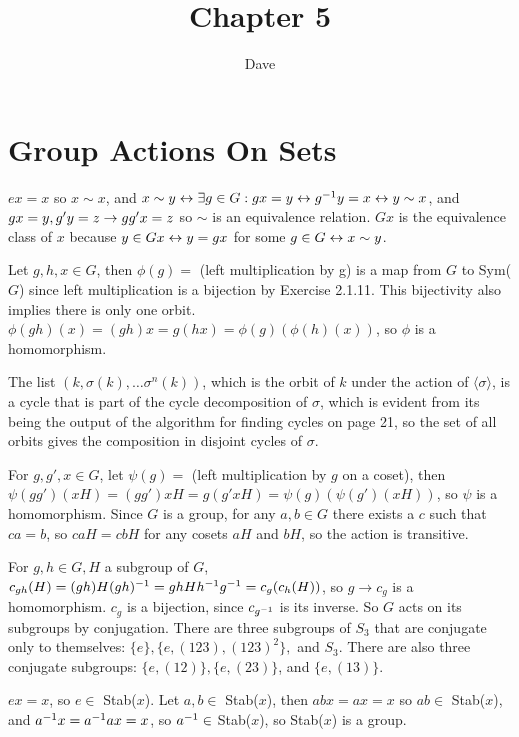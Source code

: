\documentclass[11pt, oneside]{article}   	%
\title{Chapter 5}
\author{Dave}
\begin{document}
\maketitle
\section{Group Actions On Sets}
\be
\item $ex = x$ so $x \sim x$, and $x \sim y \leftrightarrow \exists g \in G : gx = y \leftrightarrow g^{-1} y = x \leftrightarrow y \sim x$, and $gx = y, g'y = z \rightarrow gg'x = z$ so $\sim$ is an equivalence relation. $Gx$ is the equivalence class of $x$ because $y \in Gx \leftrightarrow y = gx$ for some $g \in G \leftrightarrow x \sim y$. 
\item Let $g, h, x \in G$, then $\phi(g) = $ (left multiplication by g) is a map from $G$ to Sym($G$) since left multiplication is a bijection by Exercise 2.1.11. This bijectivity also implies there is only one orbit. $\phi(gh)(x) = (gh)x = g(hx) = \phi(g)(\phi(h)(x))$, so $\phi$ is a homomorphism. 
\item The list $(k, \sigma(k), \ldots \sigma^n(k))$, which is the orbit of $k$ under the action of $\langle \sigma \rangle$, is a cycle that is part of the cycle decomposition of $\sigma$, which is evident from its being the output of the algorithm for finding cycles on page 21, so the set of all orbits gives the composition in disjoint cycles of $\sigma$. 
\item For $g, g', x \in G$, let $\psi(g) = $ (left multiplication by $g$ on a coset), then $\psi(gg')(xH) = (gg')xH = g(g'xH) = \psi(g)(\psi(g')(xH))$, so $\psi$ is a homomorphism. Since $G$ is a group, for any $a, b \in G$ there exists a $c$ such that $ca = b$, so $caH = cbH$ for any cosets $aH$ and $bH$, so the action is transitive.
\item For $g, h \in G, H$ a subgroup of $G$, $c_{gh}(H) = (gh)H(gh)^{-1} = ghHh^{-1} g^{-1} = c_g(c_h(H))$, so $g\to c_g$ is a homomorphism. $c_g$ is a bijection, since $c_{g^{-1}}$ is its inverse. So $G$ acts on its subgroups by conjugation. There are three subgroups of $S_3$ that are conjugate only to themselves: $\{e\}, \{e, (123), (123)^2\}, $ and $S_3$. There are also three conjugate subgroups: $\{e, (12)\}, \{e, (23)\}$, and $\{e, (13)\}$.
\item $ex = x$, so $e \in $ Stab($x$). Let $a, b \in $ Stab($x$), then $abx = ax = x$ so $ab \in $ Stab($x$), and $a^{-1} x = a^{-1} ax = x $, so $a^{-1} \in $ Stab($x$), so Stab($x$) is a group.
\end{document}
